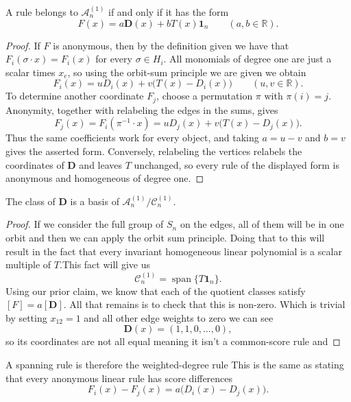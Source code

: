 \documentclass[11pt]{scrartcl}
\begin{document}
\begin{soln}
    \begin{claim*}
        A rule belongs to $\mathcal A_n^{(1)}$ if and only if it has
        the form
        \[
        F(x)=a\mathbf D(x)+bT(x)\mathbf 1_n
        \qquad(a,b\in\mathbb R).
        \]
    \end{claim*}

    \begin{proof}
        If $F$ is anonymous, then by the definition given we have that $F_i(\sigma\cdot x)=F_i(x)$ for
        every $\sigma\in H_i$.
		All monomials of degree one are just a scalar times $x_e$, 
		so using the orbit-sum principle we are given we obtain
        \[
        F_i(x)=uD_i(x)+v\bigl(T(x)-D_i(x)\bigr)
        \qquad(u,v\in\mathbb R).
        \]
        To determine another coordinate $F_j$, choose a permutation
        $\pi$ with $\pi(i)=j$.
        Anonymity, together with relabeling the edges in the sums,
        gives
        \[
        F_j(x)
        =F_i(\pi^{-1}\cdot x)
        =uD_j(x)+v\bigl(T(x)-D_j(x)\bigr).
        \]
        Thus the same coefficients work for every object, and taking
        $a=u-v$ and $b=v$ gives the asserted form.
        Conversely, relabeling the vertices relabels the coordinates
        of $\mathbf D$ and leaves $T$ unchanged, so every rule of the
        displayed form is anonymous and homogeneous of degree one.
    \end{proof}

    \begin{claim*}
        The class of $\mathbf D$ is a basis of
        $\mathcal A_n^{(1)}/\mathcal C_n^{(1)}$.
    \end{claim*}

    \begin{proof}
		If we consider the full group of $S_n$ on the edges, all of them
		will be in one orbit and then we can apply the orbit sum principle. Doing
		that to this will result in the fact that every invariant homogeneous
		 linear polynomial is a scalar multiple of $T$.This fact will give us
        \[
        \mathcal C_n^{(1)}
        =\operatorname{span}\{T\mathbf 1_n\}.
        \]
        Using our prior claim, we know that each of the quotient classes
		satisfy
        $[F]=a[\mathbf D]$.
		All that remains is to check that this is non-zero. Which is trivial by
		setting $x_{12}=1$ and all other edge weights to zero we can see
        \[
        \mathbf D(x)=(1,1,0,\ldots,0),
        \]
        so its coordinates are not all equal meaning it isn't a common-score rule and
    \end{proof}

    A spanning rule is therefore the weighted-degree rule
    This is the same as stating that every anonymous linear rule has score differences
    \[
    F_i(x)-F_j(x)=a\bigl(D_i(x)-D_j(x)\bigr).
    \]
\end{soln}
\end{document}
